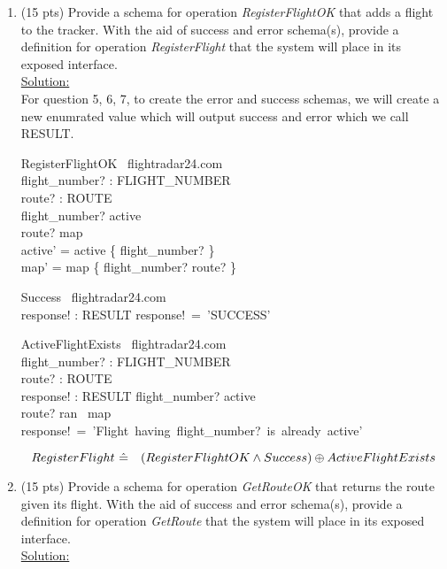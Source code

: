 \documentclass[12pt]{article}
\begin{document}
\begin{enumerate}
\item (15 pts) Provide a schema for operation \emph{RegisterFlightOK} that adds a flight to the
tracker. With the aid of success and error schema(s), provide a definition for operation
\emph{RegisterFlight} that the system will place in its exposed interface. \\
\noindent \underline{Solution:}\\

For question 5, 6, 7, to create the error and success schemas, we will create a new enumrated value which will output success and error which we call RESULT. 

\begin{schema}{RegisterFlightOK}
\Delta \ flightradar24.com\\
flight\_number? : FLIGHT\_NUMBER\\
route? : ROUTE\\
\where
flight\_number? \notin active\\
route? \notin \ran map\\
active' = active \cup \{ flight\_number? \}\\
map' = map \cup \{ flight\_number? \mapsto route? \}\
\end{schema}

\begin{schema}{Success}
\Xi \ flightradar24.com\\
response! : RESULT
\where
response!~=~'SUCCESS'\\
\end{schema}



\begin{schema}{ActiveFlightExists}
\Xi \ flightradar24.com\\
flight\_number? : FLIGHT\_NUMBER\\
route? : ROUTE \\
response! : RESULT
\ST
flight\_number? \in active\\
route? \in ran \ map \\
response!~=~'Flight~having~flight\_number?~is~already~active'
\end{schema}


\[ RegisterFlight~\hat{=}~\\
~~~(RegisterFlightOK \wedge Success) \oplus ActiveFlightExists \]




\item (15 pts) Provide a schema for operation \emph{GetRouteOK} that returns the route given its
flight. With the aid of success and error schema(s), provide a definition for operation
\emph{GetRoute} that the system will place in its exposed interface. \\
\noindent \underline{Solution:}\\


\end{enumerate}
\end{document}
